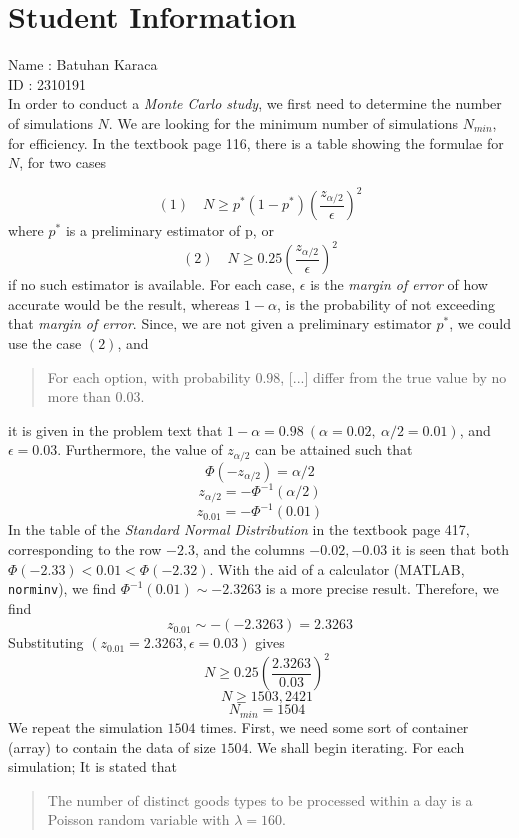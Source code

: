 \documentclass[12pt]{article}
\begin{document}
\section*{Student Information}

Name : Batuhan Karaca \\

ID : 2310191 \\

In order to conduct a \textit{Monte Carlo study}, we first need to determine
the number of simulations $N$. We are looking for the minimum number
of simulations $N_{min}$, for efficiency. In the textbook page 116, there is a table 
showing the formulae for $N$, for two cases 

$$(1) \quad N \geq p^*(1-p^*)(\frac{z_{\alpha/2}}{\epsilon})^2$$
where $p^*$ is a preliminary estimator of p, or
$$(2) \quad N \geq 0.25(\frac{z_{\alpha/2}}{\epsilon})^2$$
if no such estimator is available. For each case, 
$\epsilon$ is the \textit{margin of error} of how accurate would be the result, whereas
$1-\alpha$, is the probability of not exceeding that \textit{margin of error}.
Since, we are not given a preliminary estimator $p^*$,
we could use the case $(2)$, and
\begin{quotation}
    For each option, with probability $0.98$, [...] differ from the true value by no more than $0.03$.
\end{quotation}
it is given in the problem text that $1-\alpha=0.98\ (\alpha=0.02,\ \alpha/2 = 0.01)$, and $\epsilon=0.03$. 
Furthermore, the value of $z_{\alpha/2}$ can be attained such that
$$\Phi(-z_{\alpha/2})=\alpha/2$$
$$z_{\alpha/2}=-\Phi^{-1}(\alpha/2)$$
$$z_{0.01}=-\Phi^{-1}(0.01)$$
In the table of the \textit{Standard Normal Distribution} 
in the textbook page 417, corresponding to the row $-2.3$, and the 
columns $-0.02, -0.03$ it is seen that both $\Phi(-2.33)< 0.01 <\Phi(-2.32)$.
With the aid of a calculator (MATLAB, \texttt{norminv}), we find $\Phi^{-1}(0.01) \sim -2.3263$ 
is a more precise result. Therefore, we find
$$z_{0.01}\sim-(-2.3263)=2.3263$$ 
Substituting $(z_{0.01}=2.3263, \epsilon=0.03)$ gives
$$\quad N \geq 0.25(\frac{2.3263}{0.03})^2$$
$$\quad N \geq 1503,2421$$
$$\quad N_{min} = 1504$$
We repeat the simulation $1504$ times. First, we need some sort of container (array) to contain the 
data of size $1504$. We shall begin iterating. For each simulation;
It is stated that
\begin{quotation}
    The number of distinct goods types to be processed within a 
    day is a Poisson random variable with $\lambda= 160$. 
\end{quotation}
\end{document}
